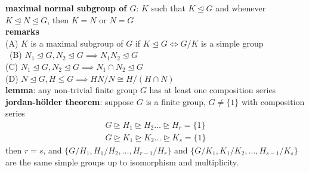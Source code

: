 \documentclass[a4paper]{article}
\begin{document}
\begin{multicols}{2}
\begin{framed}
	\noindent
	\textbf{maximal normal subgroup of $G$}: $K$ such that $K \unlhd G$ and whenever $K \unlhd N \unlhd G$, then $K = N$ or $N = G$\\
	
	\noindent
	\textbf{remarks}\\
	(A) $K$ is a maximal subgroup of $G$ if $K \unlhd G \iff G/K$ is a simple group\\\
	(B) $N_1 \unlhd G, N_2 \unlhd G \implies N_1N_2 \unlhd G$\\
	(C) $N_1 \unlhd G, N_2 \unlhd G \implies N_1 \cap N_2 \unlhd G$\\
	(D) $N \unlhd G, H \leq G \implies HN / N \cong H / (H \cap N)$\\
	
	\noindent
	\textbf{lemma}: any non-trivial finite group $G$ has at least one composition series\\
	
	\noindent
	\textbf{jordan-h\"older theorem}: suppose $G$ is a finite group, $G \neq \{1\}$ with composition series
	\begin{align*}
	G \unrhd H_1 \unrhd H_2 \dots \unrhd H_r = \{1\}\\
	G \unrhd K_1 \unrhd K_2 \dots \unrhd K_s = \{1\}
	\end{align*}
	then $r = s$, and $\{G/H_1, H_1 / H_2, \dots, H_{r-1} / H_r\}$ and $\{G/K_1, K_1 / K_2, \dots, H_{s-1} / K_s\}$ are the same simple groups up to isomorphism and multiplicity.
\end{framed}

\end{multicols}
\end{document}
